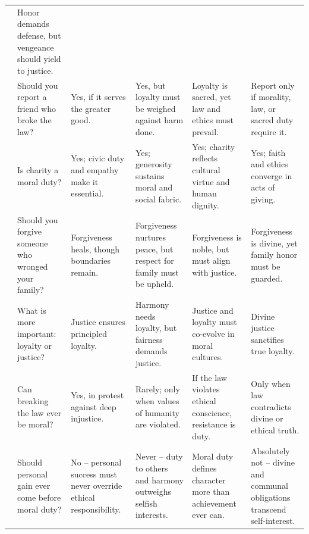 \begin{table}[htbp]
{\begin{tabular}{@{}p{} p{} p{} p{} p{} p{}@{}}
& Honor demands defense, but vengeance should yield to justice.
\\
& Should you report a friend who broke the law?
& Yes, if it serves the greater good.
& Yes, but loyalty must be weighed against harm done.
& Loyalty is sacred, yet law and ethics must prevail.
& Report only if morality, law, or sacred duty require it.
\\
& Is charity a moral duty?
& Yes; civic duty and empathy make it essential.
& Yes; generosity sustains moral and social fabric.
& Yes; charity reflects cultural virtue and human dignity.
& Yes; faith and ethics converge in acts of giving.
\\
& Should you forgive someone who wronged your family?
& Forgiveness heals, though boundaries remain.
& Forgiveness nurtures peace, but respect for family must be upheld.
& Forgiveness is noble, but must align with justice.
& Forgiveness is divine, yet family honor must be guarded.
\\
& What is more important: loyalty or justice?
& Justice ensures principled loyalty.
& Harmony needs loyalty, but fairness demands justice.
& Justice and loyalty must co-evolve in moral cultures.
& Divine justice sanctifies true loyalty.
\\
& Can breaking the law ever be moral?
& Yes, in protest against deep injustice.
& Rarely; only when values of humanity are violated.
& If the law violates ethical conscience, resistance is duty.
& Only when law contradicts divine or ethical truth.
\\
& Should personal gain ever come before moral duty?
& No -- personal success must never override ethical responsibility.
& Never -- duty to others and harmony outweighs selfish interests.
& Moral duty defines character more than achievement ever can.
& Absolutely not -- divine and communal obligations transcend self-interest.
\\
\bottomrule
\end{tabular}%
}
\end{table}






\clearpage
